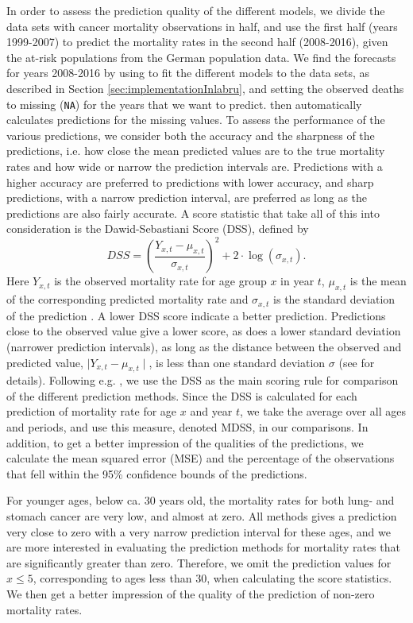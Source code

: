 In order to assess the prediction quality of the different models, we divide the data sets with cancer mortality observations in half, and use the first half (years 1999-2007) to predict the mortality rates in the second half (2008-2016), given the at-risk populations from the German population data. We find the forecasts for years 2008-2016 by using \inlabru to fit the different models to the data sets, as described in Section \ref{sec:implementationInlabru}, and setting the observed deaths to missing (\texttt{NA}) for the years that we want to predict. \inlabru then automatically calculates predictions for the missing values. 
To assess the performance of the various predictions, we consider both the accuracy and the sharpness of the predictions, i.e. how close the mean predicted values are to the true mortality rates and how wide or narrow the prediction intervals are. Predictions with a higher accuracy are preferred to predictions with lower accuracy, and sharp predictions, with a narrow prediction interval, are preferred as long as the predictions are also fairly accurate. A score statistic that take all of this into consideration is the Dawid-Sebastiani Score (DSS), defined by 
\begin{equation}
    DSS = (\frac{Y_{x,t} - \mu_{x,t}}{\sigma_{x,t}})^2 + 2\cdot \log(\sigma_{x,t}).
\end{equation}
Here $Y_{x,t}$ is the observed mortality rate for age group $x$ in year $t$, $\mu_{x,t}$ is the mean of the corresponding predicted mortality rate and $\sigma_{x,t}$ is the standard deviation of the prediction \parencite{Gneiting2007}. A lower DSS score indicate a better prediction. Predictions close to the observed value give a lower score, as does a lower standard deviation (narrower prediction intervals), as long as the distance between the observed and predicted value, $\mid Y_{x,t} - \mu_{x,t} \mid$, is less than one standard deviation $\sigma$ (see \textcite{Keilman2020} for details). Following e.g. \textcite{RieblerHeldRue2012}, we use the DSS as the main scoring rule for comparison of the different prediction methods. Since the DSS is calculated for each prediction of mortality rate for age $x$ and year $t$, we take the average over all ages and periods, and use this measure, denoted MDSS, in our comparisons. In addition, to get a better impression of the qualities of the predictions, we calculate the mean squared error (MSE) and the percentage of the observations that fell within the 95\% confidence bounds of the predictions.

\newpar For younger ages, below ca. 30 years old, the mortality rates for both lung- and stomach cancer are very low, and almost at zero. All methods gives a prediction very close to zero with a very narrow prediction interval for these ages, and we are more interested in evaluating the prediction methods for mortality rates that are significantly greater than zero. Therefore, we omit the prediction values for $x \leq 5$, corresponding to ages less than 30, when calculating the score statistics. We then get a better impression of the quality of the prediction of non-zero mortality rates. 

